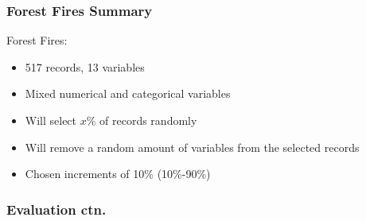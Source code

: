 \documentclass{beamer}
\begin{document}
\begin{frame}
  \frametitle{Forest Fires Summary}
  Forest Fires:
  \begin{itemize}
    \item 517 records, 13 variables
    \item Mixed numerical and categorical variables
    \item Will select $x\%$ of records randomly 
    \item Will remove a random amount of variables from the selected records
    \item Chosen increments of 10\% (10\%-90\%)
  \end{itemize}
\end{frame}

\begin{frame}
  \frametitle{Evaluation ctn.}
\end{frame}
\end{document}
